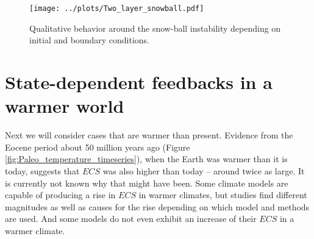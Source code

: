 \documentclass[12pt]{book}
\begin{document}

\begin{figure}
\begin{center}
\texttt{[image: ../plots/Two\_layer\_snowball.pdf]}
\end{center}
\caption{ Qualitative behavior around the snow-ball instability depending on initial  and boundary conditions. %
} 
\label{fig:snowball_twolayer}
\end{figure}


\section{State-dependent feedbacks in a warmer world}
Next we will consider cases that are warmer than present. Evidence from the Eocene period about 50 million years ago (Figure \ref{fig:Paleo_temperature_timeseries}), when the Earth was warmer than it is today, suggests that $ECS$ was also higher than today -- around twice as large. It is currently not known why that might have been. Some climate models are capable of producing a rise in $ECS$ in warmer climates, but studies find different magnitudes as well as causes for the rise depending on which model and methods are used. And some models do not even exhibit an increase of their $ECS$ in a warmer climate. 
\end{document}
